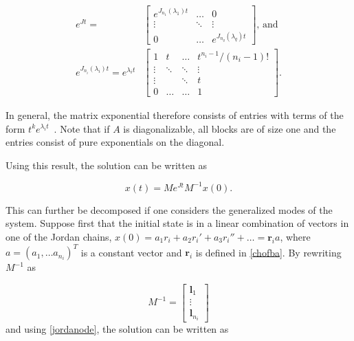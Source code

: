 \documentclass[../main.tex]{subfiles}
\begin{document}
\begin{equation}\label{eq:expjordan}
    \begin{aligned}
        e^{Jt} = &\begin{bmatrix}e^{J_{n_1}(\lambda_1)t} & \dots & 0 \\
                                                         \vdots & \ddots & \vdots \\
                                                         0 & \dots &  e^{J_{n_q}(\lambda_q)t}\end{bmatrix} \text{, and } \\
            e^{J_{n_i}(\lambda_i)t} = e^{\lambda_it} &\begin{bmatrix} 1 & t & \dots & t^{n_i-1}/(n_i-1)! \\
                                                                \vdots  & \ddots & \ddots & \vdots \\
                                                                \vdots & & \ddots& t \\
                                                            0 & \dots & \dots & 1\ \end{bmatrix}.
    \end{aligned}
\end{equation}

In general, the matrix exponential therefore consists of entries with terms of the form $t^ke^{\lambda_it}$~\cite{uffe}. Note that if $A$ is diagonalizable, all blocks are of size one and the entries consist of pure exponentials on the diagonal. 

Using this result, the solution can be written as 

\begin{equation}\label{jordanode}
    x(t) = Me^{Jt}M^{-1}x(0).
\end{equation}

This can further be decomposed if one considers the generalized modes of the system. Suppose first that the initial state is in a linear combination of vectors in one of the Jordan chains, $x(0) = a_1r_i + a_2r_i' + a_3r_i'' + \dots = \boldsymbol{r}_ia$, where $a = (a_1, \dots a_{n_i})^T$ is a constant vector and $\boldsymbol{r}_i$ is defined in \cref{chofba}. By rewriting $M^{-1}$ as

\begin{equation}
    M^{-1} = \begin{bmatrix} \boldsymbol{l}_1 \\ \vdots \\ \boldsymbol{l}_{n_i} \end{bmatrix}
\end{equation}
and using \cref{jordanode}, the solution can be written as
\end{document}
